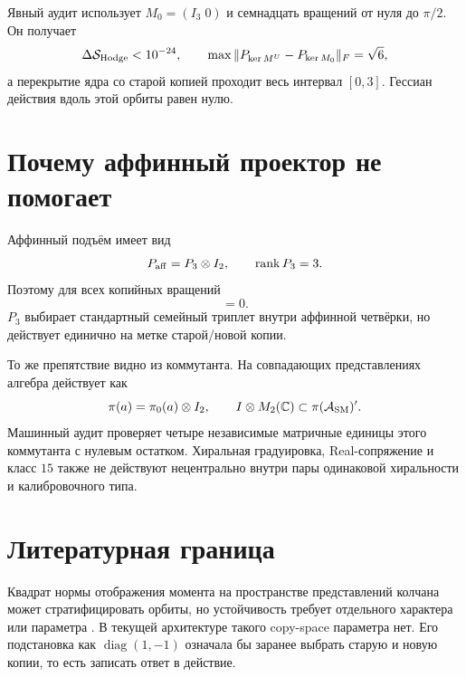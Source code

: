 Явный аудит использует $M_0=(I_3\;0)$ и семнадцать вращений от нуля до
$\pi/2$. Он получает
\begin{equation}
 \Delta\mathcal S_{\rm Hodge}<10^{-24},
 \qquad
 \max\|P_{\ker M^U}-P_{\ker M_0}\|_F=\sqrt6,
 \label{eq:v7-copy-selector-orbit-audit}
\end{equation}
а перекрытие ядра со старой копией проходит весь интервал $[0,3]$.
Гессиан действия вдоль этой орбиты равен нулю.

\section{Почему аффинный проектор не помогает}

Аффинный подъём имеет вид
\begin{equation}
 P_{\rm aff}=P_3\otimes I_2,
 \qquad \operatorname{rank} P_3=3.
 \label{eq:v7-copy-selector-affine-lift}
\end{equation}
Поэтому для всех копийных вращений
\begin{equation}
 [P_3\otimes I_2,I_4\otimes U]=0.
 \label{eq:v7-copy-selector-affine-commutator}
\end{equation}
$P_3$ выбирает стандартный семейный триплет внутри аффинной четвёрки, но
действует единично на метке старой/новой копии.

То же препятствие видно из коммутанта. На совпадающих представлениях
алгебра действует как
\begin{equation}
 \pi(a)=\pi_0(a)\otimes I_2,
 \qquad
 I\otimes M_2(\mathbb C)\subset\pi(\mathcal A_{\rm SM})'.
 \label{eq:v7-copy-selector-copy-commutant}
\end{equation}
Машинный аудит проверяет четыре независимые матричные единицы этого
коммутанта с нулевым остатком. Хиральная градуировка, Real-сопряжение и
класс $15$ также не действуют нецентрально внутри пары одинаковой
хиральности и калибровочного типа.

\section{Литературная граница}

Квадрат нормы отображения момента на пространстве представлений колчана
может стратифицировать орбиты, но устойчивость требует отдельного характера
или параметра \cite{v7copy-quiver}. В текущей архитектуре такого
copy-space параметра нет. Его подстановка как
$\operatorname{diag}(1,-1)$ означала бы заранее выбрать старую и новую
копии, то есть записать ответ в действие.

